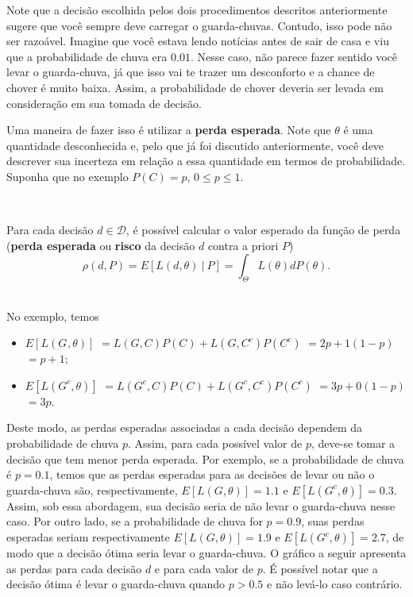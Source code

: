\documentclass[
]{book}
\begin{document}
Note que a decisão escolhida pelos dois procedimentos descritos anteriormente sugere que você sempre deve carregar o guarda-chuvas. Contudo, isso pode não ser razoável. Imagine que você estava lendo notícias antes de sair de casa e viu que a probabilidade de chuva era \(0.01\). Nesse caso, não parece fazer sentido você levar o guarda-chuva, já que isso vai te trazer um desconforto e a chance de chover é muito baixa. Assim, a probabilidade de chover deveria ser levada em consideração em sua tomada de decisão.

Uma maneira de fazer isso é utilizar a \textbf{perda esperada}. Note que \(\theta\) é uma quantidade desconhecida e, pelo que já foi discutido anteriormente, você deve descrever sua incerteza em relação a essa quantidade em termos de probabilidade. Suponha que no exemplo \(P(C)=p\), \(0\leq p\leq 1\).

\(~\)

Para cada decisão \(d \in \mathcal{D}\), é possível calcular o valor esperado da função de perda (\textbf{perda esperada} ou \textbf{risco} da decisão \(d\) contra a priori \(P\))
\[\rho(d,P) = E\left[L(d,\theta) ~|~ P\right] = \int_{\Theta} L(\theta) dP(\theta).\]
\(~\)

No exemplo, temos

\begin{itemize}
\item
  \(E\left[L(G^{},\theta)\right]\) \(=L(G,C)P(C) + L(G,C^c)P(C^c)\) \(=2p+1(1-p)\) \(=p+1\);
\item
  \(E\left[L(G^c,\theta)\right]\) \(=L(G^c,C)P(C) + L(G^c,C^c)P(C^c)\) \(=3p+0(1-p)\) \(=3p\).
\end{itemize}

Deste modo, as perdas esperadas associadas a cada decisão dependem da probabilidade de chuva \(p\). Assim, para cada possível valor de \(p\), deve-se tomar a decisão que tem menor perda esperada. Por exemplo, se a probabilidade de chuva é \(p=0.1\), temos que as perdas esperadas para as decisões de levar ou não o guarda-chuva são, respectivamente, \(E\left[L(G,\theta)\right]=1.1\) e \(E\left[L(G^c,\theta)\right]=0.3\). Assim, sob essa abordagem, sua decisão seria de não levar o guarda-chuva nesse caso. Por outro lado, se a probabilidade de chuva for \(p=0.9\), suas perdas esperadas seriam respectivamente \(E\left[L(G,\theta)\right]=1.9\) e \(E\left[L(G^c,\theta)\right]=2.7\), de modo que a decisão ótima seria levar o guarda-chuva. O gráfico a seguir apresenta as perdas para cada decisão \(d\) e para cada valor de \(p\). É possível notar que a decisão ótima é levar o guarda-chuva quando \(p>0.5\) e não levá-lo caso contrário.
\end{document}
